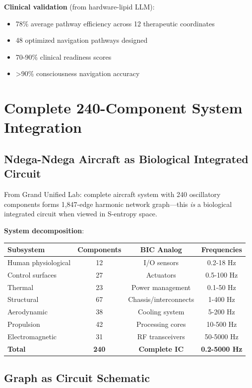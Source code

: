 \documentclass[11pt,a4paper]{article}
\begin{document}
\textbf{Clinical validation} (from hardware-lipid LLM):
\begin{itemize}
\item 78\% average pathway efficiency across 12 therapeutic coordinates
\item 48 optimized navigation pathways designed
\item 70-90\% clinical readiness scores
\item >90\% consciousness navigation accuracy
\end{itemize}

\section{Complete 240-Component System Integration}

\subsection{Ndega-Ndega Aircraft as Biological Integrated Circuit}

From Grand Unified Lab: complete aircraft system with 240 oscillatory components forms 1,847-edge harmonic network graph—this \textit{is} a biological integrated circuit when viewed in S-entropy space.

\textbf{System decomposition}:

\begin{center}
\begin{tabular}{lccc}
\toprule
\textbf{Subsystem} & \textbf{Components} & \textbf{BIC Analog} & \textbf{Frequencies} \\
\midrule
Human physiological & 12 & I/O sensors & 0.2-18 Hz \\
Control surfaces & 27 & Actuators & 0.5-100 Hz \\
Thermal & 23 & Power management & 0.1-50 Hz \\
Structural & 67 & Chassis/interconnects & 1-400 Hz \\
Aerodynamic & 38 & Cooling system & 5-200 Hz \\
Propulsion & 42 & Processing cores & 10-500 Hz \\
Electromagnetic & 31 & RF transceivers & 50-5000 Hz \\
\midrule
\textbf{Total} & \textbf{240} & \textbf{Complete IC} & \textbf{0.2-5000 Hz} \\
\bottomrule
\end{tabular}
\end{center}

\subsection{Graph as Circuit Schematic}
\end{document}
